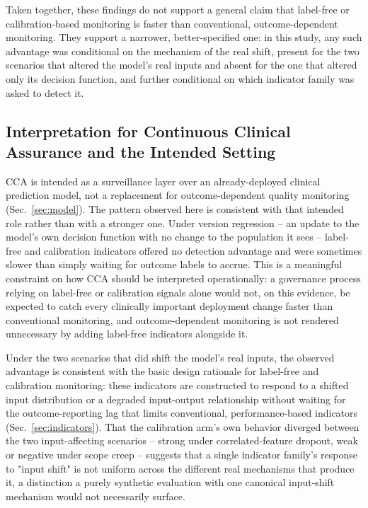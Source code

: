 \documentclass[apajournal,article,submit,oneauthor]{Definitions/mdpi}
\begin{document}
Taken together, these findings do not support a general claim that label-free or calibration-based monitoring is faster than conventional, outcome-dependent monitoring. They support a narrower, better-specified one: in this study, any such advantage was conditional on the mechanism of the real shift, present for the two scenarios that altered the model's real inputs and absent for the one that altered only its decision function, and further conditional on which indicator family was asked to detect it.

\subsection{Interpretation for Continuous Clinical Assurance and the Intended Setting}\label{sec:disc-interpretation}

CCA is intended as a surveillance layer over an already-deployed clinical prediction model, not a replacement for outcome-dependent quality monitoring (Sec.~\ref{sec:model}). The pattern observed here is consistent with that intended role rather than with a stronger one. Under version regression -- an update to the model's own decision function with no change to the population it sees -- label-free and calibration indicators offered no detection advantage and were sometimes slower than simply waiting for outcome labels to accrue. This is a meaningful constraint on how CCA should be interpreted operationally: a governance process relying on label-free or calibration signals alone would not, on this evidence, be expected to catch every clinically important deployment change faster than conventional monitoring, and outcome-dependent monitoring is not rendered unnecessary by adding label-free indicators alongside it.

Under the two scenarios that did shift the model's real inputs, the observed advantage is consistent with the basic design rationale for label-free and calibration monitoring: these indicators are constructed to respond to a shifted input distribution or a degraded input-output relationship without waiting for the outcome-reporting lag that limits conventional, performance-based indicators (Sec.~\ref{sec:indicators}). That the calibration arm's own behavior diverged between the two input-affecting scenarios -- strong under correlated-feature dropout, weak or negative under scope creep -- suggests that a single indicator family's response to "input shift" is not uniform across the different real mechanisms that produce it, a distinction a purely synthetic evaluation with one canonical input-shift mechanism would not necessarily surface.
\end{document}
